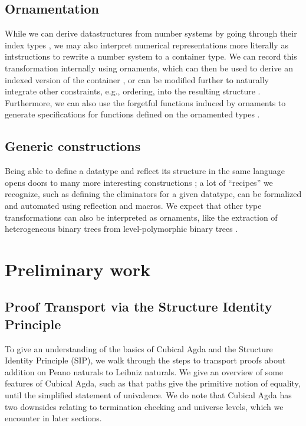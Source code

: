 \documentclass{article}
\theoremstyle{plain}%
\theoremstyle{definition}
\begin{document}

\subsection{Ornamentation}
While we can derive datastructures from number systems by going through their index types \cite{calcdata}, we may also interpret numerical representations more literally as intstructions to rewrite a number system to a container type. We can record this transformation internally using ornaments, which can then be used to derive an indexed version of the container \cite{algorn}, or can be modified further to naturally integrate other constraints, e.g., ordering, into the resulting structure \cite{progorn}. Furthermore, we can also use the forgetful functions induced by ornaments to generate specifications for functions defined on the ornamented types \cite{orntrans}.

\subsection{Generic constructions}
Being able to define a datatype and reflect its structure in the same language opens doors to many more interesting constructions \cite{practgen}; a lot of ``recipes'' we recognize, such as defining the eliminators for a given datatype, can be formalized and automated using reflection and macros. We expect that other type transformations can also be interpreted as ornaments, like the extraction of heterogeneous binary trees from level-polymorphic binary trees \cite{hetbin}. 

\section{Preliminary work}\label{sec:preliminary}
\subsection{Proof Transport via the Structure Identity Principle}\label{sec:leibniz}
%
To give an understanding of the basics of Cubical Agda \cite{cuagda} and the Structure Identity Principle (SIP), we walk through the steps to transport proofs about addition on Peano naturals to Leibniz naturals. We give an overview of some features of Cubical Agda, such as that paths give the primitive notion of equality, until the simplified statement of univalence. We do note that Cubical Agda has two downsides relating to termination checking and universe levels, which we encounter in later sections.
\end{document}
